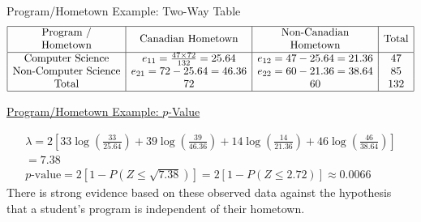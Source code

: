 \documentclass[oneside]{book}
\begin{document}
\begin{Example}{Program/Hometown Example: Two-Way Table}{}
    \[ \begin{array}{|c|c|c|c|}
            \hline \begin{array}{c}
                       \text{Program /} \\
                       \text{Hometown}
                   \end{array}     & \text{Canadian Hometown}               & \begin{array}{c}
                                                                                  \text{Non-Canadian} \\
                                                                                  \text{Hometown}
                                                                              \end{array} & \text{Total}        \\
            \hline
            \text{Computer Science}     & e_{11}=\frac{47 \times{72}}{132}=25.64 & e_{12}=47-25.64=21.36  & 47  \\
            \text{Non-Computer Science} & e_{21}=72-25.64=46.36                  & e_{22}=60-21.36=38.64  & 85  \\
            \text{Total}                & 72                                     & 60                     & 132 \\
            \hline
        \end{array} \]

    \underline{Program/Hometown Example: $ p $-Value}

    \[
        \begin{aligned}
            \lambda=2\left[33 \log \left(\frac{33}{25.64}\right)+39 \log \left(\frac{39}{46.36}\right)+14 \log \left(\frac{14}{21.36}\right)+46 \log \left(\frac{46}{38.64}\right)\right] \\
            =7.38                                                                                                                                                                         \\
            p \text{-value}=2[1-P(Z \leq \sqrt{7.38})]=2[1-P(Z \leq 2.72)] \approx 0.0066
        \end{aligned}
    \]
    There is strong evidence based on these observed data against the hypothesis that a student's program is independent of their hometown.
\end{Example}
\end{document}
